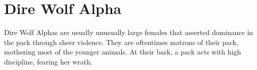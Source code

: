 \section{Dire Wolf Alpha}

Dire Wolf Alphas are usually unusually large females that asserted dominance in the pack through sheer violence. They are oftentimes matrons of their pack, mothering most of the younger animals. At their bark, a pack acts with high discipline, fearing her wrath.